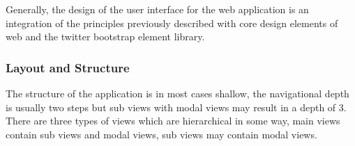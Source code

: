 
Generally, the design of the user interface for the web application is an integration of the principles previously described with core design elements of web and the twitter bootstrap element library. 

\subsubsection{Layout and Structure}
The structure of the application is in most cases shallow, the navigational depth is usually two steps but sub views with modal views may result in a depth of 3. There are three types of views which are hierarchical in some way, main views contain sub views and modal views, sub views may contain modal views.

